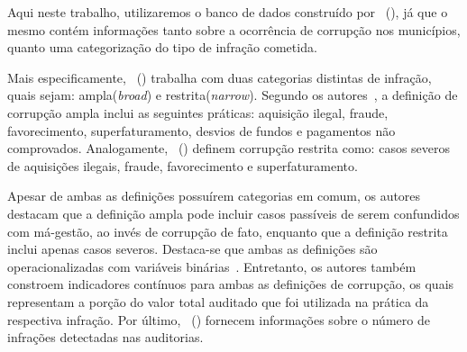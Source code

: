 \documentclass[
	12pt,				%
	openright,			%
	twoside,			%
	a4paper,			%
	openany,
	english,			%
	brazil				%
	]{abntex2}
\begin{document}


Aqui neste trabalho, utilizaremos o banco de dados construído por ~(\citeyear{Brollo2013Aug}), já que o mesmo contém informações tanto sobre a ocorrência de corrupção nos municípios, quanto uma categorização do tipo de infração cometida.

Mais especificamente, ~(\citeyear{Brollo2013Aug}) trabalha com duas categorias distintas de infração, quais sejam: ampla(\textit{broad}) e restrita(\textit{narrow}). Segundo os autores~\cite{Brollo2013Aug}, a definição de corrupção ampla inclui as seguintes práticas: aquisição ilegal, fraude, favorecimento, superfaturamento, desvios de fundos e pagamentos não comprovados. Analogamente, ~(\citeyear{Brollo2013Aug}) definem corrupção restrita como: casos severos de aquisições ilegais, fraude, favorecimento e superfaturamento. 

Apesar de ambas as definições possuírem categorias em comum, os autores~\cite{Brollo2013Aug} destacam que a definição ampla pode incluir casos passíveis de serem confundidos com má-gestão, ao invés de corrupção de fato, enquanto que a definição restrita inclui apenas casos severos. Destaca-se que ambas as definições são operacionalizadas com variáveis binárias~\cite{Botero2021Apr}. Entretanto, os autores também constroem indicadores contínuos para ambas as definições de corrupção, os quais representam a porção do valor total auditado que foi utilizada na prática da respectiva infração. Por último, ~(\citeyear{Botero2021Apr}) fornecem informações sobre o número de infrações detectadas nas auditorias.
\end{document}
